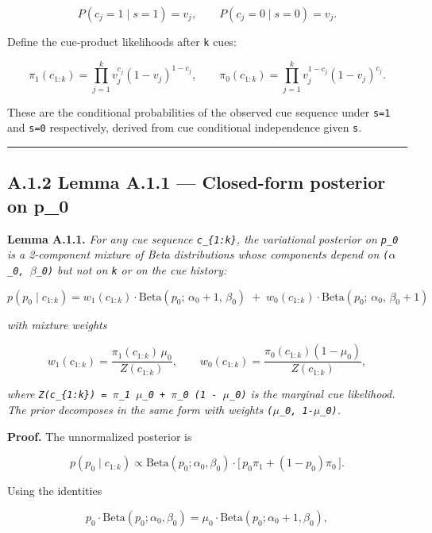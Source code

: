 \documentclass{article}
\begin{document}
\[
P(c_j = 1 \mid s = 1) = v_j, \qquad P(c_j = 0 \mid s = 0) = v_j.
\]

Define the cue-product likelihoods after \texttt{k} cues:

\[
\pi_1(c_{1:k}) = \prod_{j=1}^{k} v_j^{c_j}(1-v_j)^{1-c_j}, \qquad
\pi_0(c_{1:k}) = \prod_{j=1}^{k} v_j^{1-c_j}(1-v_j)^{c_j}.
\]

These are the conditional probabilities of the observed cue sequence
under \texttt{s=1} and \texttt{s=0} respectively, derived from cue
conditional independence given \texttt{s}.

\begin{center}\rule{0.5\linewidth}{0.5pt}\end{center}

\subsection{A.1.2 Lemma A.1.1 --- Closed-form posterior on
p\_0}\label{a.1.2-lemma-a.1.1-closed-form-posterior-on-p_0}

\textbf{Lemma A.1.1.} \emph{For any cue sequence \texttt{c\_\{1:k\}},
the variational posterior on \texttt{p\_0} is a 2-component mixture of
Beta distributions whose components depend on \texttt{(\ensuremath{\alpha}\_0,\ \ensuremath{\beta}\_0)} but
not on \texttt{k} or on the cue history:}

\[
p(p_0 \mid c_{1:k}) = w_1(c_{1:k}) \cdot \mathrm{Beta}(p_0;\, \alpha_0+1,\, \beta_0) \;+\; w_0(c_{1:k}) \cdot \mathrm{Beta}(p_0;\, \alpha_0,\, \beta_0+1)
\]

\emph{with mixture weights}

\[
w_1(c_{1:k}) = \frac{\pi_1(c_{1:k}) \, \mu_0}{Z(c_{1:k})}, \qquad
w_0(c_{1:k}) = \frac{\pi_0(c_{1:k}) (1-\mu_0)}{Z(c_{1:k})},
\]

\emph{where \texttt{Z(c\_\{1:k\})\ =\ \ensuremath{\pi}\_1\ \ensuremath{\mu}\_0\ +\ \ensuremath{\pi}\_0\ (1\ -\ \ensuremath{\mu}\_0)}
is the marginal cue likelihood. The prior decomposes in the same form
with weights \texttt{(\ensuremath{\mu}\_0,\ 1-\ensuremath{\mu}\_0)}.}

\textbf{Proof.} The unnormalized posterior is

\[
p(p_0 \mid c_{1:k}) \propto \mathrm{Beta}(p_0; \alpha_0, \beta_0) \cdot \big[\,p_0 \pi_1 + (1-p_0)\pi_0\,\big].
\]

Using the identities

\[
p_0 \cdot \mathrm{Beta}(p_0; \alpha_0, \beta_0) = \mu_0 \cdot \mathrm{Beta}(p_0; \alpha_0+1, \beta_0),
\]
\end{document}
